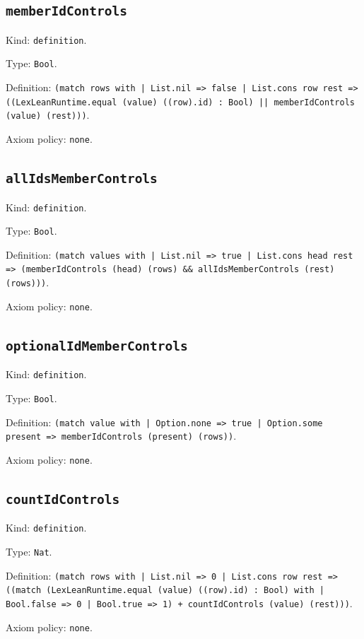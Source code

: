 \documentclass[11pt]{article}
\begin{document}
\subsection*{\texttt{memberIdControls}}
\noindent Kind: \texttt{definition}.\par
\noindent Type: \texttt{Bool}.\par
\noindent Definition: \texttt{(match rows with | List.nil => false | List.cons row rest => ((LexLeanRuntime.equal (value) ((row).id) : Bool) || memberIdControls (value) (rest)))}.\par
\noindent Axiom policy: \texttt{none}.\par
\subsection*{\texttt{allIdsMemberControls}}
\noindent Kind: \texttt{definition}.\par
\noindent Type: \texttt{Bool}.\par
\noindent Definition: \texttt{(match values with | List.nil => true | List.cons head rest => (memberIdControls (head) (rows) \&\& allIdsMemberControls (rest) (rows)))}.\par
\noindent Axiom policy: \texttt{none}.\par
\subsection*{\texttt{optionalIdMemberControls}}
\noindent Kind: \texttt{definition}.\par
\noindent Type: \texttt{Bool}.\par
\noindent Definition: \texttt{(match value with | Option.none => true | Option.some present => memberIdControls (present) (rows))}.\par
\noindent Axiom policy: \texttt{none}.\par
\subsection*{\texttt{countIdControls}}
\noindent Kind: \texttt{definition}.\par
\noindent Type: \texttt{Nat}.\par
\noindent Definition: \texttt{(match rows with | List.nil => 0 | List.cons row rest => ((match (LexLeanRuntime.equal (value) ((row).id) : Bool) with | Bool.false => 0 | Bool.true => 1) + countIdControls (value) (rest)))}.\par
\noindent Axiom policy: \texttt{none}.\par
\end{document}
